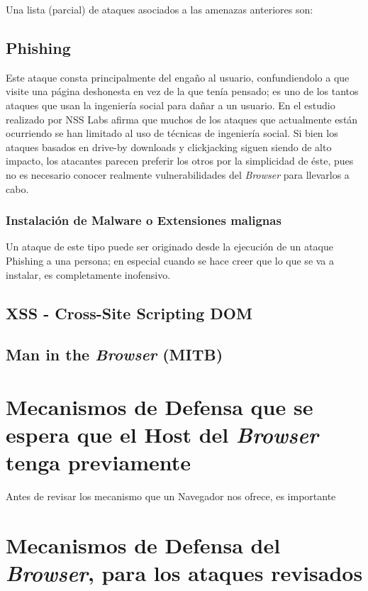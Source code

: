 Una lista (parcial) de ataques asociados a las amenazas anteriores son:

\subsection{Phishing}
Este ataque consta principalmente del engaño al usuario, confundiendolo a que visite una página deshonesta en vez de la que tenía pensado; es uno de los tantos ataques que usan la ingeniería social para dañar a un usuario. En el estudio realizado por NSS Labs \cite{browSecPhish} afirma que muchos de los ataques que actualmente están ocurriendo se han limitado al uso de técnicas de ingeniería social. Si bien los ataques basados en drive-by downloads y clickjacking siguen siendo de alto impacto, los atacantes parecen preferir los otros por la simplicidad de éste, pues no es necesario conocer realmente vulnerabilidades del \textit{Browser} para llevarlos a cabo. 
	\subsubsection{Instalación de Malware o Extensiones malignas}
	Un ataque de este tipo puede ser originado desde la ejecución de un ataque Phishing a una persona; en especial cuando se hace creer que lo que se va a instalar, es completamente inofensivo.

\subsection{XSS - Cross-Site Scripting DOM}


\subsection{Man in the \textit{Browser} (MITB)}



\section{Mecanismos de Defensa que se espera que el Host del \textit{Browser} tenga previamente}
	Antes de revisar los mecanismo que un Navegador nos ofrece, es importante 


\section{Mecanismos de Defensa del \textit{Browser}, para los ataques revisados}

